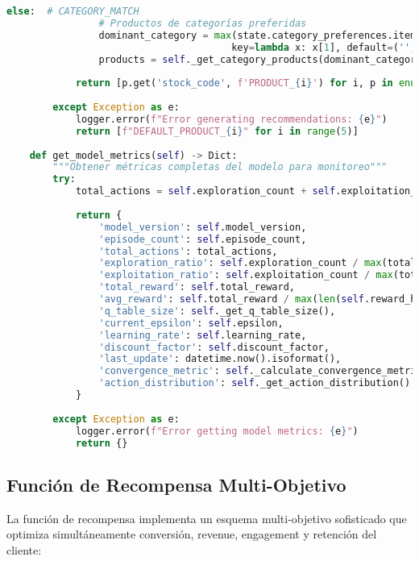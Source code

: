 \begin{lstlisting}[language=python, caption=Implementación Completa del Agente Q-Learning, label=lst:ql_implementation]
            else:  # CATEGORY_MATCH
                # Productos de categorías preferidas
                dominant_category = max(state.category_preferences.items(), 
                                       key=lambda x: x[1], default=('', 0))[0]
                products = self._get_category_products(dominant_category, state.country)
            
            return [p.get('stock_code', f'PRODUCT_{i}') for i, p in enumerate(products)]
            
        except Exception as e:
            logger.error(f"Error generating recommendations: {e}")
            return [f"DEFAULT_PRODUCT_{i}" for i in range(5)]
    
    def get_model_metrics(self) -> Dict:
        """Obtener métricas completas del modelo para monitoreo"""
        try:
            total_actions = self.exploration_count + self.exploitation_count
            
            return {
                'model_version': self.model_version,
                'episode_count': self.episode_count,
                'total_actions': total_actions,
                'exploration_ratio': self.exploration_count / max(total_actions, 1),
                'exploitation_ratio': self.exploitation_count / max(total_actions, 1),
                'total_reward': self.total_reward,
                'avg_reward': self.total_reward / max(len(self.reward_history), 1),
                'q_table_size': self._get_q_table_size(),
                'current_epsilon': self.epsilon,
                'learning_rate': self.learning_rate,
                'discount_factor': self.discount_factor,
                'last_update': datetime.now().isoformat(),
                'convergence_metric': self._calculate_convergence_metric(),
                'action_distribution': self._get_action_distribution()
            }
            
        except Exception as e:
            logger.error(f"Error getting model metrics: {e}")
            return {}
\end{lstlisting}

\subsection{Función de Recompensa Multi-Objetivo}
\label{subsec:funcion_recompensa}

La función de recompensa implementa un esquema multi-objetivo sofisticado que optimiza simultáneamente conversión, revenue, engagement y retención del cliente:

